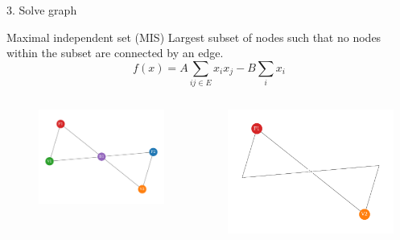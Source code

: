 \documentclass[handout]{beamer}
\begin{document}
\begin{frame}{3. Solve graph}
    \begin{alertblock}{Maximal independent set (MIS)}
        Largest subset of nodes such that no nodes within the subset are connected by an edge.
        \begin{equation*}
            f(x)=A\sum_{ij\in E}x_ix_j-B\sum_i x_i
        \end{equation*}
    \end{alertblock}
    \begin{columns}
        \begin{column}{0.5\textwidth}
            \begin{figure}
                \centering
                \includegraphics[width=0.9\textwidth]{../Figures/toy_graph.pdf}
            \end{figure}
        \end{column}
        \begin{column}{0.5\textwidth}
            \centering
            \includegraphics[width=0.9\textwidth]{../Figures/toy_solution.pdf}
        \end{column}
    \end{columns}
\end{frame}
\end{document}
